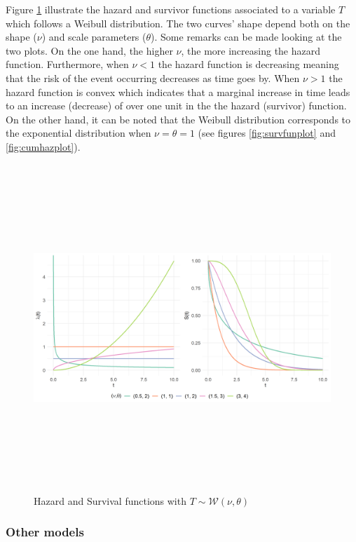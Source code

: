 \documentclass[
]{book}
\begin{document}
Figure \ref{fig:weibullplots} illustrate the hazard and survivor functions associated to a variable \(T\) which follows a Weibull distribution. The two curves' shape depend both on the shape (\(\nu\)) and scale parameters (\(\theta\)). Some remarks can be made looking at the two plots. On the one hand, the higher \(\nu\), the more increasing the hazard function. Furthermore, when \(\nu < 1\) the hazard function is decreasing meaning that the risk of the event occurring decreases as time goes by. When \(\nu > 1\) the hazard function is convex which indicates that a marginal increase in time leads to an increase (decrease) of over one unit in the the hazard (survivor) function. On the other hand, it can be noted that the Weibull distribution corresponds to the exponential distribution when \(\nu = \theta = 1\) (see figures \ref{fig:survfunplot} and \ref{fig:cumhazplot}).

\begin{figure}

{\centering \includegraphics[width=700pt,height=350pt]{./imgs/weibull_plots} 

}

\caption{Hazard and Survival functions with $T \sim \mathcal{W} (\nu, \theta)$}\label{fig:weibullplots}
\end{figure}

\hypertarget{other-models}{%
\subsubsection*{Other models}\label{other-models}}
\end{document}
